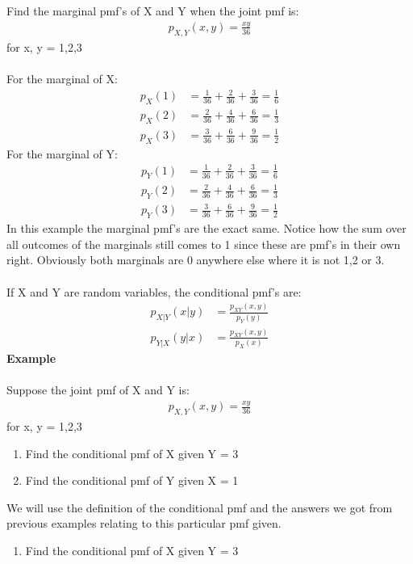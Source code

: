 \documentclass[,oneside]{article}
\begin{document}
\begin{enumerate}
Find the marginal pmf's of X and Y when the joint pmf is:
\begin{align*}
p_{X,Y}(x,y)=\frac{xy}{36}
\end{align*}
for x, y = 1,2,3 \\ \\
For the marginal of X: 
\begin{align*}
p_X(1)&=\frac{1}{36}+\frac{2}{36}+\frac{3}{36}=\frac{1}{6}\\
p_X(2)&=\frac{2}{36}+\frac{4}{36}+\frac{6}{36}=\frac{1}{3}\\
p_X(3)&=\frac{3}{36}+\frac{6}{36}+\frac{9}{36}=\frac{1}{2}
\end{align*}
For the marginal of Y:
\begin{align*}
p_Y(1)&=\frac{1}{36}+\frac{2}{36}+\frac{3}{36}=\frac{1}{6}\\
p_Y(2)&=\frac{2}{36}+\frac{4}{36}+\frac{6}{36}=\frac{1}{3}\\
p_Y(3)&=\frac{3}{36}+\frac{6}{36}+\frac{9}{36}=\frac{1}{2}
\end{align*}
In this example the marginal pmf's are the exact same. Notice how the sum over all outcomes of the marginals still comes to 1 since these are pmf's in their own right. Obviously both marginals are 0 anywhere else where it is not 1,2 or 3.\\ \\
If X and Y are random variables, the conditional pmf's are:
\begin{align*}
p_{X|Y}(x|y)&=\frac{p_{XY}(x,y)}{p_Y(y)}\\
p_{Y|X}(y|x)&=\frac{p_{XY}(x,y)}{p_X(x)}
\end{align*}
\textbf{Example}\\ \\
Suppose the joint pmf of X and Y is:
\begin{align*}
p_{X,Y}(x,y)=\frac{xy}{36}
\end{align*}
for x, y = 1,2,3 \\
\begin{enumerate}
\item Find the conditional pmf of X given Y = 3
\item Find the conditional pmf of Y given X = 1
\end{enumerate}
We will use the definition of the conditional pmf and the answers we got from previous examples relating to this particular pmf given. 
\begin{enumerate}
\item Find the conditional pmf of X given Y = 3

\end{enumerate}
\end{enumerate}
\end{document}
